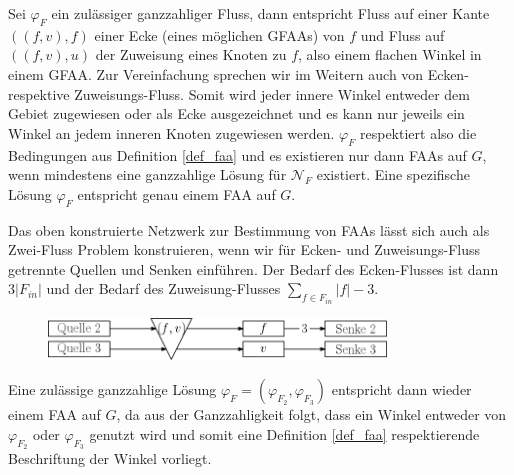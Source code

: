 Sei $\varphi_F$ ein zulässiger ganzzahliger Fluss, dann entspricht Fluss auf einer Kante $((f,v),f)$ einer Ecke (eines möglichen GFAAs) von $f$ und Fluss auf $((f,v),u)$ der Zuweisung eines Knoten zu $f$, also einem flachen Winkel in einem GFAA. Zur Vereinfachung sprechen wir im Weitern auch von Ecken- respektive Zuweisungs-Fluss. Somit wird jeder innere Winkel entweder dem Gebiet zugewiesen oder als Ecke ausgezeichnet und es kann nur jeweils ein Winkel an jedem inneren Knoten zugewiesen werden. $\varphi_F$ respektiert also die Bedingungen aus Definition \ref{def_faa} und es existieren nur dann FAAs auf $G$, wenn mindestens eine ganzzahlige Lösung für $\mathcal{N}_F$ existiert. Eine spezifische Lösung $\varphi_F$ entspricht genau einem FAA auf $G$.

\begin{remark}

Das oben konstruierte Netzwerk zur Bestimmung von FAAs lässt sich auch als Zwei-Fluss Problem konstruieren, wenn wir für Ecken- und Zuweisungs-Fluss getrennte Quellen und Senken einführen. Der Bedarf des Ecken-Flusses ist dann $3|F_{in}|$ und der Bedarf des Zuweisung-Flusses $\sum_{f \in F_{in}}{|f|-3}$.

\begin{figure}[h]
	\centering
  \includegraphics[width=0.8\textwidth]{faa_2_flow.png}
\end{figure}

Eine zulässige ganzzahlige Lösung $\varphi_F = (\varphi_{F_2},\varphi_{F_3})$ entspricht dann wieder einem FAA auf $G$, da aus der Ganzzahligkeit folgt, dass ein Winkel entweder von $\varphi_{F_2}$ oder $\varphi_{F_3}$ genutzt wird und somit eine Definition \ref{def_faa} respektierende Beschriftung der Winkel vorliegt.

\end{remark}


